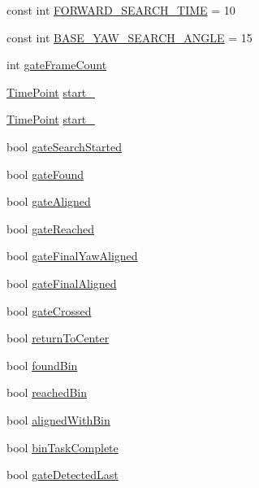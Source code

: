 \begin{DoxyCompactItemize}
\item 
const int \hyperlink{classPathPlanner_a12b219c458ee64a02f3255f76ad63be6}{F\+O\+R\+W\+A\+R\+D\+\_\+\+S\+E\+A\+R\+C\+H\+\_\+\+T\+I\+ME} = 10
\item 
const int \hyperlink{classPathPlanner_a683836da96618f1a2d6e153ef74e55a8}{B\+A\+S\+E\+\_\+\+Y\+A\+W\+\_\+\+S\+E\+A\+R\+C\+H\+\_\+\+A\+N\+G\+LE} = 15
\item 
int \hyperlink{classPathPlanner_a1807065a92d2188817a495bf89195132}{gate\+Frame\+Count}
\item 
\hyperlink{thruster__driver_8cpp_ad3e807c387dc076de974ff7eac67ad81}{Time\+Point} \hyperlink{classPathPlanner_a69d65cdba15fc71183ac337212b9c33f}{start\+\_}
\item 
\hyperlink{thruster__driver_8cpp_ad3e807c387dc076de974ff7eac67ad81}{Time\+Point} \hyperlink{classPathPlanner_afbb083470238dda8254a9d60032ae6d3}{start\+\_}
\item 
bool \hyperlink{classPathPlanner_a4bd99311cef29b79bc2d016ad0977d76}{gate\+Search\+Started}
\item 
bool \hyperlink{classPathPlanner_a3ed3d7942b9417d48ff9aa520493a241}{gate\+Found}
\item 
bool \hyperlink{classPathPlanner_afa8a249b6baf8ec217082eca1c1dc0f9}{gate\+Aligned}
\item 
bool \hyperlink{classPathPlanner_a30b4a90a40e1725347b19a521fd2e085}{gate\+Reached}
\item 
bool \hyperlink{classPathPlanner_ae30224fe26e2e73e0ffff2469ce0d885}{gate\+Final\+Yaw\+Aligned}
\item 
bool \hyperlink{classPathPlanner_a7231798c51e6e722389795cca59ec16e}{gate\+Final\+Aligned}
\item 
bool \hyperlink{classPathPlanner_a07768a73e0b9edc93611d12df1d2f20d}{gate\+Crossed}
\item 
bool \hyperlink{classPathPlanner_acbee7c3c100b1b1b7d0f946100953db7}{return\+To\+Center}
\item 
bool \hyperlink{classPathPlanner_ac649564f82726f564a0e4b1446886c5d}{found\+Bin}
\item 
bool \hyperlink{classPathPlanner_a30fb3f87413d9204db076f92b8df064f}{reached\+Bin}
\item 
bool \hyperlink{classPathPlanner_a61566d814449039efd5feaec4ebd217a}{aligned\+With\+Bin}
\item 
bool \hyperlink{classPathPlanner_a7c037b4370ae019db2950d0bbb20b885}{bin\+Task\+Complete}
\item 
bool \hyperlink{classPathPlanner_a8550d5f0f5e6840d74c482e8c9ec4f17}{gate\+Detected\+Last}

\end{DoxyCompactItemize}
